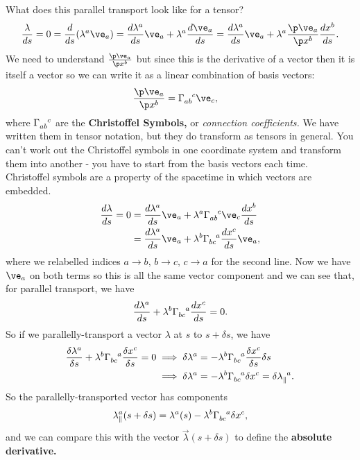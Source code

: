 \documentclass[a4paper, 11pt, normalem]{report}
\begin{document}
What does this parallel transport look like for a tensor?
\begin{align}
    \frac{\lambda}{ds} = 0 = \frac{d}{ds}(\lambda^a\ve_a) = \frac{d\lambda^a}{ds}\ve_a+\lambda^a\frac{d\ve_a}{ds} = \frac{d\lambda^a}{ds}\ve_a + \lambda^a\frac{\p\ve_a}{\p x^b}\frac{dx^b}{ds}.
\end{align}
We need to understand $\frac{\p\ve_a}{\p x^b}$ but since this is the derivative of a vector then it is itself a vector so we can write it as a linear combination of basis vectors:
\begin{align}
    \frac{\p\ve_a}{\p x^b} &= \tensor{\Gamma}{_{ab}^c}\ve_c,
\end{align}
where $\tensor{\Gamma}{_{ab}^c}$ are the \textbf{Christoffel Symbols,} or \emph{connection coefficients.}
We have written them in tensor notation, but they do  transform as tensors in general. 
You can't work out the Christoffel symbols in one coordinate system and transform them into another - you have to start from the basis vectors each time. 
Christoffel symbols are a property of the spacetime in which vectors are embedded. 
\begin{align}
    \begin{split}
        \frac{d\lambda}{ds} = 0 &= \frac{d\lambda^a}{ds}\ve_a + \lambda^a\tensor{\Gamma}{_{ab}^c}\ve_c\frac{dx^b}{ds} \\
                                &= \frac{d\lambda^a}{ds}\ve_a + \lambda^b\tensor{\Gamma}{_{bc}^a}\frac{dx^c}{ds}\ve_a,
    \end{split}
\end{align}
where we relabelled indices $a\to b,\,b\to c,\,c\to a$ for the second line. 
Now we have $\ve_a$ on both terms so this is all the same vector component and we can see that, for parallel transport, we have
\begin{align}
    \frac{d\lambda^a}{ds}+\lambda^b\tensor{\Gamma}{_{bc}^a}\frac{dx^c}{ds}=0.
\end{align}
So if we parallelly-transport a vector $\lambda$ at $s$ to $s+\delta s$, we have
\begin{align}
    \frac{\delta\lambda^a}{\delta s} + \lambda^b\tensor{\Gamma}{_{bc}^a}\frac{\delta x^c}{\delta s} = 0 \implies \delta\lambda^a &= -\lambda^b\tensor{\Gamma}{_{bc}^a}\frac{\delta x^c}{\delta s}\delta s \\
    \implies \delta\lambda^a &= -\lambda^b\tensor{\Gamma}{_{bc}^a}\delta x^c = \delta\tensor{\lambda}{_{\parallel}^a}.
\end{align}
So the parallelly-transported vector has components
\begin{align}
    \lambda_{\parallel}^a(s+\delta s) = \lambda^a(s) - \lambda^b\tensor{\Gamma}{_{bc}^a}\delta x^c,
\end{align}
and we can compare this with the vector $\vec{\lambda}(s+\delta s)$ to define the \textbf{absolute derivative.}
\end{document}
